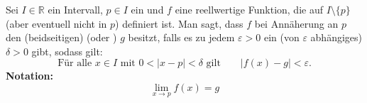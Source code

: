 Sei $I \in \mathbb{R}$ ein Intervall, $p \in I$ ein  und $f$ eine reellwertige Funktion, die auf $I \setminus \{p\}$ (aber eventuell nicht in $p$) definiert ist. Man sagt, dass $f$ bei Annäherung an $p$ den (beidseitigen)  (oder ) $g$ besitzt, falls es zu jedem $\varepsilon > 0$ ein (von $\varepsilon$ abhängiges) $\delta > 0$ gibt, sodass gilt:
$$\text{Für alle $x \in I$ mit $0 < | x - p | < \delta$ gilt} \qquad | f (x) - g | < \varepsilon.$$
\textbf{Notation:}
$$\lim_{x \to p} f(x) = g$$